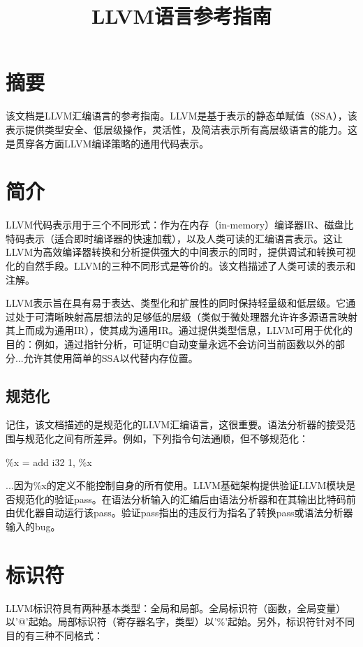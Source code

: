 \documentclass[12pt,a4paper]{article}
\title{LLVM语言参考指南}
\begin{document}
\maketitle

\section{摘要}

该文档是LLVM汇编语言的参考指南。LLVM是基于表示的静态单赋值（SSA），该表示提供类型安全、低层级操作，灵活性，及简洁表示所有高层级语言的能力。这是贯穿各方面LLVM编译策略的通用代码表示。

\section{简介}

LLVM代码表示用于三个不同形式：作为在内存（in-memory）编译器IR、磁盘比特码表示（适合即时编译器的快速加载），以及人类可读的汇编语言表示。这让LLVM为高效编译器转换和分析提供强大的中间表示的同时，提供调试和转换可视化的自然手段。LLVM的三种不同形式是等价的。该文档描述了人类可读的表示和注解。

LLVM表示旨在具有易于表达、类型化和扩展性的同时保持轻量级和低层级。它通过处于可清晰映射高层想法的足够低的层级（类似于微处理器允许许多源语言映射其上而成为通用IR），使其成为通用IR。通过提供类型信息，LLVM可用于优化的目的：例如，通过指针分析，可证明C自动变量永远不会访问当前函数以外的部分...允许其使用简单的SSA以代替内存位置。

\subsection{规范化}

记住，该文档描述的是规范化的LLVM汇编语言，这很重要。语法分析器的接受范围与规范化之间有所差异。例如，下列指令句法通顺，但不够规范化：

\%x = add i32 1, \%x

...因为\%x的定义不能控制自身的所有使用。LLVM基础架构提供验证LLVM模块是否规范化的验证pass。在语法分析输入的汇编后由语法分析器和在其输出比特码前由优化器自动运行该pass。验证pass指出的违反行为指名了转换pass或语法分析器输入的bug。

\section{标识符}

LLVM标识符具有两种基本类型：全局和局部。全局标识符（函数，全局变量）以'@'起始。局部标识符（寄存器名字，类型）以'\%'起始。另外，标识符针对不同目的有三种不同格式：
\end{document}
